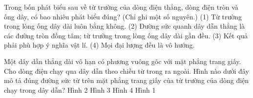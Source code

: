 \begin{ex}
Trong bốn phát biểu sau về từ trường của dòng điện thẳng, dòng điện tròn và ống dây, có bao nhiêu phát biểu đúng? (Chỉ ghi một số nguyên.) (1) Từ trường trong lòng ống dây dài luôn bằng không. (2) Đường sức quanh dây dẫn thẳng là các đường tròn đồng tâm; từ trường trong lòng ống dây dài gần đều. (3) Kết quả phải phù hợp ý nghĩa vật lí. (4) Mọi đại lượng đều là vô hướng.
\end{ex}

\begin{ex}
Một dây dẫn thẳng dài vô hạn có phương vuông góc với mặt phẳng trang giấy. Cho dòng điện chạy qua dây dẫn theo chiều từ trong ra ngoài. Hình nào dưới đây mô tả đúng đường sức từ trên mặt phẳng trang giấy của từ trường của dòng điện chạy trong dây dẫn?
\choice
{Hình 2}
{\True Hình 3}
{Hình 4}
{Hình 1}
\end{ex}

